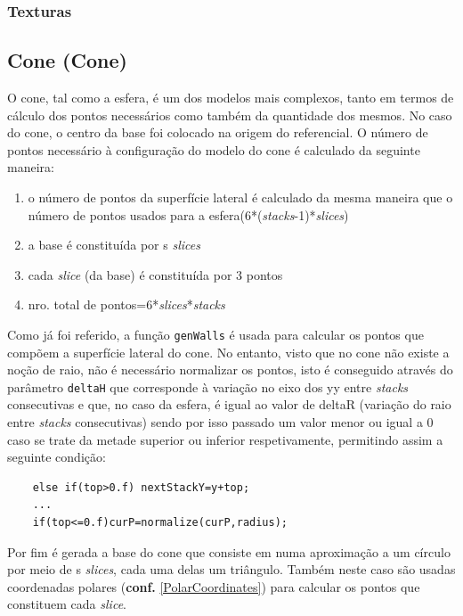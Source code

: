 \documentclass{article}
\begin{document}
\subsubsection{Texturas}

\subsection{Cone (Cone)}
O cone, tal como a esfera, é um dos modelos mais complexos, tanto em termos de cálculo dos pontos necessários como também da quantidade dos mesmos. No caso do cone, o centro da base foi colocado na origem do referencial. O número de pontos necessário à configuração do modelo do cone é calculado da seguinte maneira:
\begin{enumerate}
    \item o número de pontos da superfície lateral é calculado da mesma maneira que o número de pontos usados para a esfera(6*(\textit{stacks}-1)*\textit{slices})
    \item a base é constituída por s \textit{slices}
    \item cada \textit{slice} (da base) é constituída por 3 pontos
    \item nro. total de pontos=6*\textit{slices}*\textit{stacks}
\end{enumerate}

Como já foi referido, a função \texttt{genWalls} é usada para calcular os pontos que compõem a superfície lateral do cone. No entanto, visto que no cone não existe a noção de raio, não é necessário normalizar os pontos, isto é conseguido através do parâmetro \texttt{deltaH} que corresponde à variação no eixo dos yy entre \textit{stacks} consecutivas e que, no caso da esfera, é igual ao valor de deltaR (variação do raio entre \textit{stacks} consecutivas) sendo por isso passado um valor menor ou igual a 0 caso se trate da metade superior ou inferior respetivamente, permitindo assim a seguinte condição:

\begin{Verbatim}
    else if(top>0.f) nextStackY=y+top;
    ...
    if(top<=0.f)curP=normalize(curP,radius);
\end{Verbatim}

Por fim é gerada a base do cone que consiste em numa aproximação a um círculo por meio de s \textit{slices}, cada uma delas um triângulo. Também neste caso são usadas coordenadas polares (\textbf{conf.} \ref{PolarCoordinates}) para calcular os pontos que constituem cada \textit{slice}.
\end{document}
